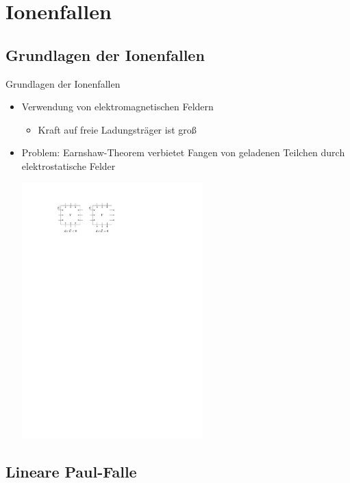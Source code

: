 \documentclass[12pt,xcolor=dvipsnames]{beamer}
\begin{document}
\section{Ionenfallen}

\subsection{Grundlagen der Ionenfallen}
\begin{frame}{Grundlagen der Ionenfallen}
	\begin{itemize}
		\setlength\itemsep{1em}
		\item Verwendung von elektromagnetischen Feldern
			\begin{itemize}
				\item Kraft auf freie Ladungsträger ist groß
			\end{itemize}
		
		\item \alert{Problem:} Earnshaw-Theorem verbietet Fangen von geladenen Teilchen durch elektrostatische Felder
		
		\vspace{0.5cm}
		\centering
		\includegraphics[width=0.55\textwidth]{./figures/earnshaw.pdf}
		
	\end{itemize}
\end{frame}

\subsection{Lineare Paul-Falle}
\end{document}
